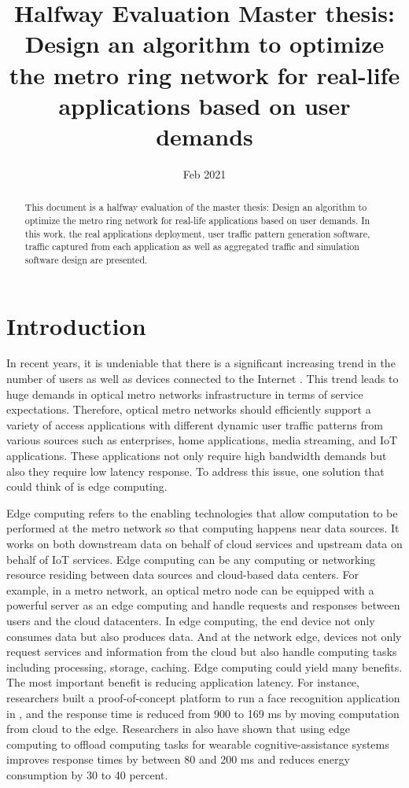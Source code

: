 \documentclass[conference]{IEEEtran}
\title{Halfway Evaluation Master thesis: Design an algorithm to optimize the metro ring network for real-life applications based on user demands}
\author{\IEEEauthorblockN{Luong Quoc Dat}
\IEEEauthorblockA{\textit{Dept. of Electrical Engineering} \\
\textit{Technical University of Eindhoven}\\
}}
\date{Feb 2021}
\begin{document}
\maketitle

\begin{abstract}
This document is a halfway evaluation of the master thesis: Design an algorithm to optimize the metro ring network for real-life applications based on user demands. In this work, the real applications deployment, user traffic pattern generation software, traffic captured from each application as well as aggregated traffic and simulation software design are presented.   
\end{abstract}


\section{Introduction}
\label{sec:Introduction}
In recent years, it is undeniable that there is a significant increasing trend in the number of users as well as devices connected to the Internet \cite{International2017}. This trend leads to huge demands in optical metro networks infrastructure in terms of service expectations. Therefore, optical metro networks should efficiently support a variety of access applications with different dynamic user traffic patterns from various sources such as enterprises, home applications, media streaming, and IoT applications. These applications not only require high bandwidth demands but also they require low latency response. To address this issue, one solution that could think of is edge computing. 

Edge computing refers to the enabling technologies that allow computation to be performed at the metro network so that computing happens near data sources. It works on both downstream data on behalf of cloud services and upstream data on behalf of IoT services. Edge computing can be any computing or networking resource residing between data sources and cloud-based data centers. For example, in a metro network, an optical metro node can be equipped with a powerful server as an edge computing and handle requests and responses between users and the cloud datacenters. In edge computing, the end device not only consumes data but also produces data. And at the network edge, devices not only request services and information from the cloud but also handle computing tasks including processing, storage, caching. Edge computing could yield many benefits. The most important benefit is reducing application latency. For instance, researchers built a proof-of-concept platform to run a face recognition application in \cite{7372286}, and the response time is reduced from 900 to 169 ms by moving computation from cloud to the edge. Researchers in \cite{5280678} also have shown that using edge computing to offload computing tasks for wearable cognitive-assistance systems improves response times by between 80 and 200 ms and reduces energy consumption by 30 to 40 percent.
\end{document}
